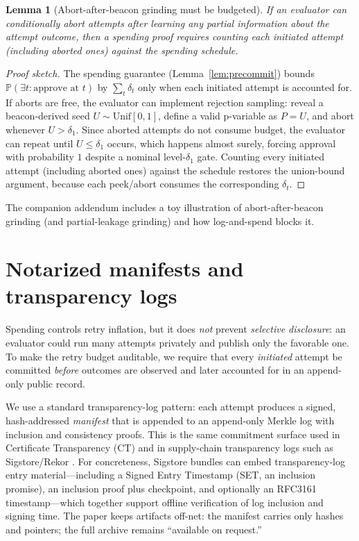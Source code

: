 \documentclass[11pt]{article}
\newtheorem{lemma}{Lemma}
\newcommand{\Pp}{\mathbb{P}}
\begin{document}
\begin{lemma}[Abort-after-beacon grinding must be budgeted]\label{lem:abort}
If an evaluator can conditionally abort attempts after learning any partial information about the attempt outcome,
then a spending proof requires counting each initiated attempt (including aborted ones) against the spending schedule.
\end{lemma}

\begin{proof}[Proof sketch]
The spending guarantee (Lemma~\ref{lem:precommit}) bounds $\Pp(\exists t:\text{approve at }t)$ by $\sum_t\delta_t$ only when each initiated attempt is accounted for.
If aborts are free, the evaluator can implement rejection sampling: reveal a beacon-derived seed $U\sim\mathrm{Unif}[0,1]$, define a valid p-variable as $P=U$, and abort whenever $U>\delta_1$.
Since aborted attempts do not consume budget, the evaluator can repeat until $U\le\delta_1$ occurs, which happens almost surely, forcing approval with probability $1$ despite a nominal level-$\delta_1$ gate.
Counting every initiated attempt (including aborted ones) against the schedule restores the union-bound argument, because each peek/abort consumes the corresponding $\delta_t$.
\end{proof}


The companion addendum includes a toy illustration of abort-after-beacon grinding (and partial-leakage grinding) and how log-and-spend blocks it. \cite{series:evalnotaryaddendum}





\section{Notarized manifests and transparency logs}
Spending controls retry inflation, but it does \emph{not} prevent \emph{selective disclosure}: an evaluator could run many attempts privately and publish only the favorable one.
To make the retry budget auditable, we require that every \emph{initiated} attempt be committed \emph{before} outcomes are observed and later accounted for in an append-only public record.

We use a standard transparency-log pattern: each attempt produces a signed, hash-addressed \emph{manifest} that is appended to an append-only Merkle log with inclusion and consistency proofs.
This is the same commitment surface used in Certificate Transparency (CT) \cite{rfc9162} and in supply-chain transparency logs such as Sigstore/Rekor \cite{newman2022sigstore}.
For concreteness, Sigstore bundles can embed transparency-log entry material---including a Signed Entry Timestamp (SET, an inclusion promise), an inclusion proof plus checkpoint, and optionally an RFC3161 timestamp---which together support offline verification of log inclusion and signing time.\cite{sigstore_bundle_spec,sigstore_threat_model}
The paper keeps artifacts off-net: the manifest carries only hashes and pointers; the full archive remains ``available on request.''
\end{document}
